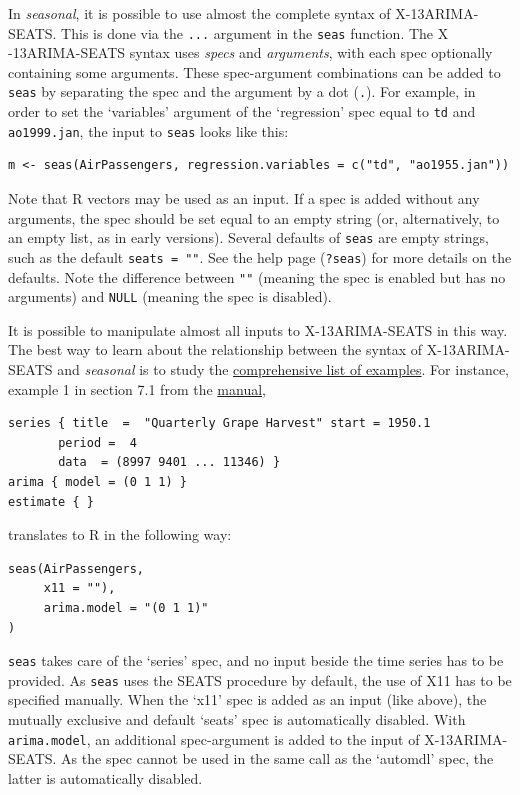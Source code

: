 In \emph{seasonal}, it is possible to use almost the complete syntax of
X-13ARIMA- SEATS. This is done via the \texttt{...} argument in the
\texttt{seas} function. The X -13ARIMA-SEATS syntax uses \emph{specs}
and \emph{arguments}, with each spec optionally containing some
arguments. These spec-argument combinations can be added to
\texttt{seas} by separating the spec and the argument by a dot
(\texttt{.}). For example, in order to set the `variables' argument of
the `regression' spec equal to \texttt{td} and \texttt{ao1999.jan}, the
input to \texttt{seas} looks like this:

\begin{verbatim}
m <- seas(AirPassengers, regression.variables = c("td", "ao1955.jan"))
\end{verbatim}

Note that R vectors may be used as an input. If a spec is added without
any arguments, the spec should be set equal to an empty string (or,
alternatively, to an empty list, as in early versions). Several defaults
of \texttt{seas} are empty strings, such as the default
\texttt{seats = ""}. See the help page (\texttt{?seas}) for more details
on the defaults. Note the difference between \texttt{""} (meaning the
spec is enabled but has no arguments) and \texttt{NULL} (meaning the
spec is disabled).

It is possible to manipulate almost all inputs to X-13ARIMA-SEATS in
this way. The best way to learn about the relationship between the
syntax of X-13ARIMA- SEATS and \emph{seasonal} is to study the
\href{http://www.seasonal.website/examples.html}{comprehensive list of
examples}. For instance, example 1 in section 7.1 from the
\href{http://www.census.gov/ts/x13as/docX13ASHTML.pdf}{manual},

\begin{verbatim}
series { title  =  "Quarterly Grape Harvest" start = 1950.1
       period =  4
       data  = (8997 9401 ... 11346) }
arima { model = (0 1 1) }
estimate { }
\end{verbatim}

translates to R in the following way:

\begin{verbatim}
seas(AirPassengers,
     x11 = ""),
     arima.model = "(0 1 1)"
)
\end{verbatim}

\texttt{seas} takes care of the `series' spec, and no input beside the
time series has to be provided. As \texttt{seas} uses the SEATS
procedure by default, the use of X11 has to be specified manually. When
the `x11' spec is added as an input (like above), the mutually exclusive
and default `seats' spec is automatically disabled. With
\texttt{arima.model}, an additional spec-argument is added to the input
of X-13ARIMA-SEATS. As the spec cannot be used in the same call as the
`automdl' spec, the latter is automatically disabled.

